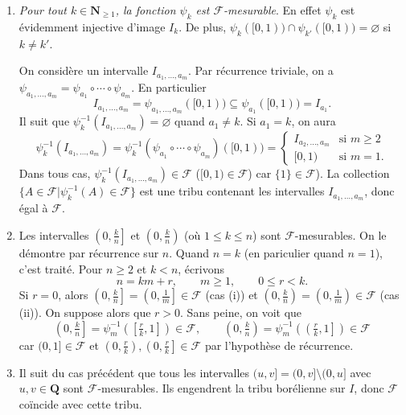 \documentclass[french]{article}
\theoremstyle{definition}
\newcommand{\tuple}[1]{\left(#1\right)}
\newcommand{\oin}[1]{\left(#1\right)}
\newcommand{\cin}[1]{\left[#1\right]}
\newcommand{\olin}[1]{\left(#1\right]}
\newcommand{\Nbb}{\mathbf{N}}
\newcommand{\Qbb}{\mathbf{Q}}
\newcommand{\Fcal}{\mathcal{F}}
\begin{document}
\begin{enumerate}
\begin{enumerate}
\begin{enumerate}
                \item {\it Pour tout $k \in \Nbb_{\ge 1}$, la fonction $\psi_k$ est $\Fcal$-mesurable}. En effet $\psi_k$ est \'evidemment injective d'image $I_k$. De plus, $\psi_k([0,1)) \cap \psi_{k'}([0,1)) = \varnothing$ si $k \neq k'$. 
                
                On consid\`ere un intervalle $I_{a_1,\ldots,a_m}$. Par r\'ecurrence triviale, on a $\psi_{a_1,\ldots,a_m} = \psi_{a_1} \circ \cdots \circ \psi_{a_m}$. En particulier 
                    $$I_{a_1,\ldots,a_m} = \psi_{a_1,\ldots,a_m}([0,1)) \subseteq \psi_{a_1}([0,1)) = I_{a_1}.$$
                Il suit que $\psi^{-1}_k(I_{a_1,\ldots,a_m}) = \varnothing$ quand $a_1 \neq k$.  Si $a_1 = k$, on aura
                    $$ \psi^{-1}_{k}(I_{a_1,\ldots,a_m}) = \psi^{-1}_k(\psi_{a_1} \circ \cdots \circ \psi_{a_m})([0,1)) = \begin{cases}
                       I_{a_2,\ldots,a_m} & \text{si } m \ge 2\\
                       [0,1) & \text{si } m = 1.
                    \end{cases}$$
                Dans tous cas, $\psi^{-1}_k(I_{a_1,\ldots,a_m}) \in \Fcal$ ($[0,1) \in \Fcal$) car $\{1\} \in \Fcal$). La collection $\{A \in \Fcal | \psi_k^{-1}(A) \in \Fcal\}$ est une tribu contenant les intervalles $I_{a_1,\ldots,a_m}$, donc \'egal \`a $\Fcal$.
                
                \item Les intervalles $\olin{0,\tfrac{k}{n}}$ et $\oin{0,\tfrac{k}{n}}$  (o\`u $1 \le k \le n$) sont $\Fcal$-mesurables. On le d\'emontre par r\'ecurrence sur $n$. Quand $n = k$ (en pariculier quand $n = 1$), c'est trait\'e. Pour $n \ge 2$ et $k < n$, \'ecrivons
                    $$n = km + r, \qquad m \ge 1, \qquad 0 \le r < k.$$
                Si $r = 0$, alors $\olin{0,\tfrac{k}{n}} = \olin{0,\tfrac{1}{m}} \in \Fcal$ (cas (i)) et $\oin{0,\tfrac{k}{n}} = \oin{0,\tfrac{1}{m}} \in \Fcal$  (cas (ii)). On suppose alors que $r > 0$. Sans peine, on voit que
                    $$\olin{0,\tfrac{k}{n}} = \psi^{-1}_m\tuple{\cin{\tfrac{r}{k},1}} \in \Fcal, \qquad \oin{0,\tfrac{k}{n}} = \psi^{-1}_m\tuple{\olin{\tfrac{r}{k},1}} \in \Fcal$$
                car $(0,1] \in \Fcal$ et $\oin{0,\tfrac{r}{k}},\olin{0,\tfrac{r}{k}}\in \Fcal$ par l'hypoth\`ese de r\'ecurrence.
                
                \item Il suit du cas pr\'ec\'edent que tous les intervalles $(u,v] = (0,v] \setminus (0,u]$ avec $u,v \in \Qbb$ sont $\Fcal$-mesurables. Ils engendrent la tribu bor\'elienne sur $I$, donc $\Fcal$ co\"incide avec cette tribu.
            \end{enumerate}
        \end{enumerate}
        

\end{enumerate}
\end{document}
